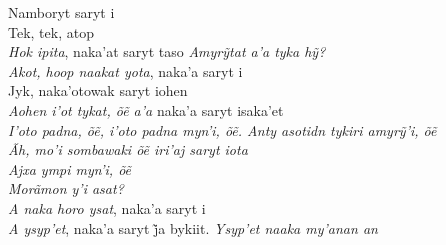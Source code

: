 \bigskip

\begin{linenumbers}\begingroup\raggedright

\noindent   Namboryt saryt i\\
  Tek, tek, atop\\
  \emph{Hok ipita}, naka’at saryt taso \emph{Amyrỹtat a’a tyka hỹ?}\\
  \emph{Akot, hoop naakat yota}, naka'a saryt i\\
  Jyk, naka'otowak saryt iohen\\
  \emph{Aohen i’ot tykat, õẽ a’a} naka’a saryt isaka’et\\
  \emph{I’oto padna, õẽ, i’oto padna myn’i, õẽ. Anty asotidn tykiri amyrỹ’i, õẽ}\\
  \emph{Ãh, mo’i sombawaki õẽ iri’aj saryt iota}\\
  \emph{Ajxa ympi myn’i, õẽ}\\
  \emph{Morãmon y'i asat?}\\
  \emph{A naka horo ysat}, naka'a saryt i\\
  \emph{A ysyp’et}, naka’a saryt j̃a bykiit. \emph{Ysyp’et naaka my’anan an}

\end{linenumbers}\endgroup

\bigskip

